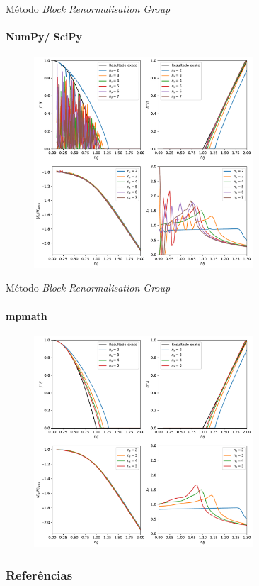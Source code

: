 \documentclass[brazil]{beamer}
\begin{document}
\begin{frame}{Método \textit{Block Renormalisation Group}}
    \framesubtitle{NumPy/ SciPy}
    \begin{figure}
        \includegraphics[width=0.73\textwidth]{teste_numpy.pdf}
    \end{figure}
\end{frame}

\begin{frame}{Método \textit{Block Renormalisation Group}}
    \framesubtitle{mpmath}
    \begin{figure}
        \includegraphics[width=0.73\textwidth]{renorm.pdf}
    \end{figure}
\end{frame}

\begin{frame}
    \frametitle{Referências}
    \nocite{*}
    
    
\end{frame}

\end{document}
